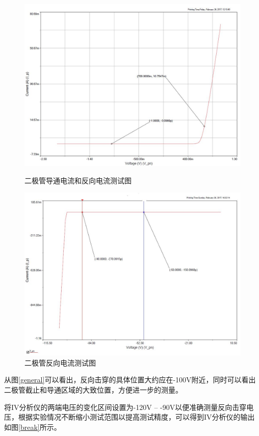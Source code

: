 \documentclass[UTF8,a4paper]{ctexart}
\begin{document}
\begin{figure}
\centering
\includegraphics[width=\textwidth]{cap/15.JPG}
\caption{二极管导通电流和反向电流测试图}
\label{normal}

\includegraphics[width=\textwidth]{cap/19.JPG}
\caption{二极管反向电流测试图}
\label{normalR}

\end{figure}

从图\ref{general}可以看出，反向击穿的具体位置大约应在-100V附近，同时可以看出二极管截止和导通区域的大致位置，方便进一步的测量。

将IV分析仪的两端电压的变化区间设置为-120V -- -90V以便准确测量反向击穿电压，根据实验情况不断缩小测试范围以提高测试精度，可以得到IV分析仪的输出如图\ref{break}所示。
\end{document}
